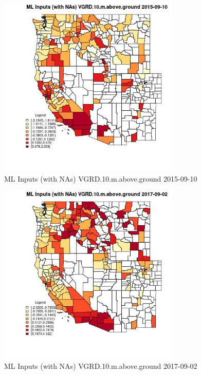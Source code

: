\begin{figure} 
\centering  
\includegraphics[width=0.77\textwidth]{Code_Outputs/Report_ML_input_PM25_Step4_part_e_de_duplicated_aves_compiled_2019-05-20wNAs_CountyVGRD10mabovegroundMean2015-09-10.jpg} 
\caption{\label{fig:Report_ML_input_PM25_Step4_part_e_de_duplicated_aves_compiled_2019-05-20wNAsCountyVGRD10mabovegroundMean2015-09-10}ML Inputs (with NAs) VGRD.10.m.above.ground 2015-09-10} 
\end{figure} 
 

\begin{figure} 
\centering  
\includegraphics[width=0.77\textwidth]{Code_Outputs/Report_ML_input_PM25_Step4_part_e_de_duplicated_aves_compiled_2019-05-20wNAs_CountyVGRD10mabovegroundMean2017-09-02.jpg} 
\caption{\label{fig:Report_ML_input_PM25_Step4_part_e_de_duplicated_aves_compiled_2019-05-20wNAsCountyVGRD10mabovegroundMean2017-09-02}ML Inputs (with NAs) VGRD.10.m.above.ground 2017-09-02} 
\end{figure} 
 

